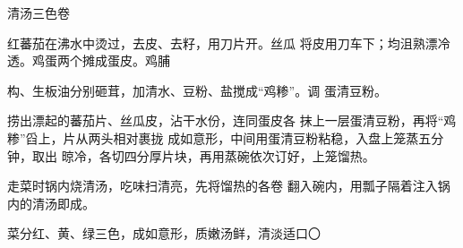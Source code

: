 \begin{recipe}[三色如意卷]{清汤三色卷}

\ingredients


\cooking

\step 红蕃茄在沸水中烫过，去皮、去籽，用刀片开。丝瓜 将皮用刀车下；均沮熟漂冷透。鸡蛋两个摊成蛋皮。鸡脯

构、生板油分别砸茸，加清水、豆粉、盐搅成“鸡糁”。调 蛋清豆粉。

\step 捞出漂起的蕃茄片、丝瓜皮，沾干水份，连同蛋皮各 抹上一层蛋清豆粉，再将“鸡糁”舀上，片从两头相对裹拢 成如意形，中间用蛋清豆粉粘稳，入盘上笼蒸五分钟，取出 晾冷，各切四分厚片块，再用蒸碗依次订好，上笼馏热。

\step 走菜时锅内烧清汤，吃味扫清亮，先将馏热的各卷 翻入碗内，用瓢子隔着注入锅内的清汤即成。

\notes

菜分红、黄、绿三色，成如意形，质嫩汤鲜，清淡适口〇

\end{recipe}

